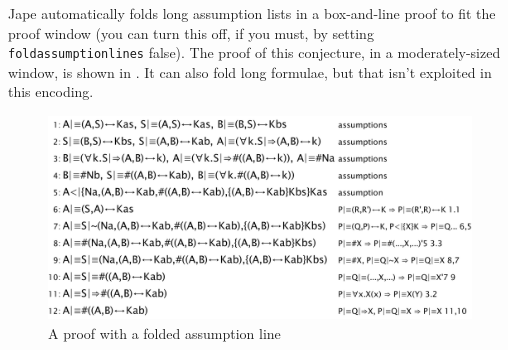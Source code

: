 Jape automatically folds long assumption lists in a box-and-line proof to fit the proof window (you can turn this off, if you must, by setting \texttt{foldassumptionlines} false). The proof of this conjecture, in a moderately-sized window, is shown in . It can also fold long formulae, but that isn't exploited in this encoding.

\begin{figure}
\centering
\includegraphics[scale=0.5]{pics/BAN/NSexample1}
\caption{A proof with a folded assumption line}
\label{fig:BAN:NSexample1}
\end{figure}

 